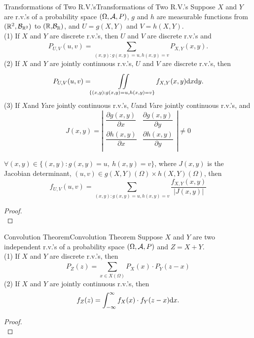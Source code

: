 \documentclass{elegantbook}
\begin{document}
\begin{theorem}{Transformations of Two R.V.'s}{Transformations of Two R.V.'s}
Suppose \(X\) and \(Y\) are r.v.'s of a probability space $(\Omega,\mathcal{A}, P)$, \(g\) and \(h\) are measurable functions from \((\mathbb{R}^{2},\mathcal{B}_{\mathbb{R}^{2}})\) to \(\mathbb{(R,}\mathcal{B}_{\mathbb{R}})\), and \(U = g(X,Y)\) and \(V = h(X,Y)\).\\
(1) If \(X\) and \(Y\) are discrete r.v.'s, then \(U\) and \(V\) are discrete r.v.'s and
\[P_{U,V}(u,v) = \sum_{(x,y):g(x,y) = u,h(x,y) = v}^{}{P_{X,Y}(x,y)}.\]
(2) If \(X\) and \(Y\) are jointly continuous r.v.'s, \(U\) and \(V\) are discrete r.v.'s, then
\[P_{U,V}(u,v) = \iint\limits_{\{(x,y):g(x,y) = u,h(x,y) = v\}}^{}{f_{X,Y}(x,y)\mathrm{d} x\mathrm{d} y.}\]
(3) If \(X\)and \(Y\)are jointly continuous r.v.'s, \(U\)and \(V\)are jointly continuous r.v.'s, and
\[J(x,y) = \left| \begin{matrix}
\dfrac{\partial g(x,y)}{\partial x} & \dfrac{\partial g(x,y)}{\partial y} \\
\dfrac{\partial h(x,y)}{\partial x} & \dfrac{\partial h(x,y)}{\partial y} \\
\end{matrix} \right| \neq 0\]

\(\forall(x,y) \in \{(x,y):g(x,y) = u,\ h(x,y) = v\}\), where \(J(x,y)\) is the Jacobian determinant, \((u,v) \in g(X,Y)(\Omega) \times h(X,Y)(\Omega)\), then
\[f_{U,V}(u,v) = \sum_{(x,y):g(x,y) = u,h(x,y) = v}^{}\frac{f_{X,Y}(x,y)}{|J(x,y)|}\]
\end{theorem}

\begin{proof}
\\[4cm]\vspace{0.01cm}
\end{proof}

\begin{theorem}{Convolution Theorem}{Convolution Theorem}
Suppose \(X\) and \(Y\) are two independent r.v.'s of a probability space $(\Omega,\mathcal{A}, P)$ and \(Z = X + Y\).\\
(1) If \(X\) and \(Y\) are discrete r.v.'s, then
\[P_{Z}(z) = \sum_{x \in X(\Omega)}^{}{P_{X}(x) \cdot}P_{Y}(z-x)\]
(2) If \(X\) and \(Y\) are jointly continuous r.v.'s, then
\[f_{Z}(z) = \int_{- \infty}^{\infty}{f_{X}(x) \cdot f_{Y}(z-x)\dif x}.\]
\end{theorem}

\begin{proof}
\\[4cm]\vspace{0.01cm}
\end{proof}
\end{document}
